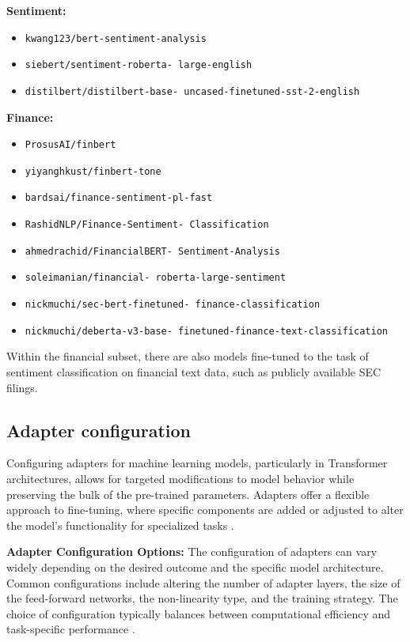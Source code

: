 \documentclass[conference]{IEEEtran}
\begin{document}
\noindent
\textbf{Sentiment:}
\begin{itemize}
\item \texttt{kwang123/bert-sentiment-analysis}
\item \texttt{siebert/sentiment-roberta- large-english}
\item \texttt{distilbert/distilbert-base- uncased-finetuned-sst-2-english}
\end{itemize}

\noindent
\textbf{Finance:}
\begin{itemize}
\item \texttt{ProsusAI/finbert}
\item \texttt{yiyanghkust/finbert-tone}
\item \texttt{bardsai/finance-sentiment-pl-fast}
\item \texttt{RashidNLP/Finance-Sentiment- Classification}
\item \texttt{ahmedrachid/FinancialBERT- Sentiment-Analysis}
\item \texttt{soleimanian/financial- roberta-large-sentiment}
\item \texttt{nickmuchi/sec-bert-finetuned- finance-classification}
\item \texttt{nickmuchi/deberta-v3-base- finetuned-finance-text-classification}
\end{itemize}

Within the financial subset, there are also models fine-tuned to the task of sentiment classification on financial text data, such as publicly available SEC filings.

\subsection{Adapter configuration}%
Configuring adapters for machine learning models, particularly in Transformer architectures, allows for targeted modifications to model behavior while preserving the bulk of the pre-trained parameters. Adapters offer a flexible approach to fine-tuning, where specific components are added or adjusted to alter the model's functionality for specialized tasks \cite{pfeiffer2020adapterhub}.

\textbf{Adapter Configuration Options:} The configuration of adapters can vary widely depending on the desired outcome and the specific model architecture. Common configurations include altering the number of adapter layers, the size of the feed-forward networks, the non-linearity type, and the training strategy. The choice of configuration typically balances between computational efficiency and task-specific performance \cite{min2023recent}.
\end{document}
